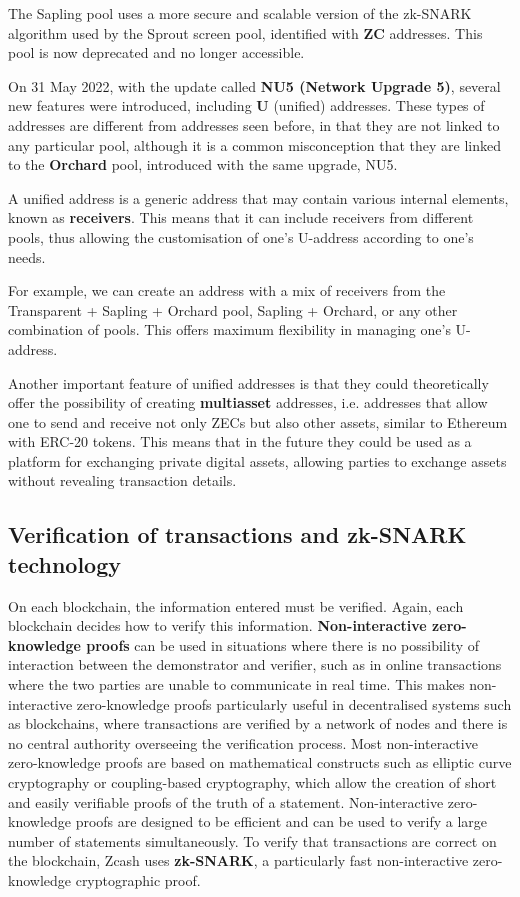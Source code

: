 \noindent The Sapling pool uses a more secure and scalable version of the zk-SNARK algorithm used by the Sprout screen pool, identified with \textbf{ZC} addresses. This pool is now deprecated and no longer accessible.

\noindent On 31 May 2022, with the update called \textbf{NU5 (Network Upgrade 5)}, several new features were introduced, including \textbf{U} (unified) addresses. These types of addresses are different from addresses seen before, in that they are not linked to any particular pool, although it is a common misconception that they are linked to the \textbf{Orchard} pool, introduced with the same upgrade, NU5.

\noindent A unified address is a generic address that may contain various internal elements, known as \textbf{receivers}. This means that it can include receivers from different pools, thus allowing the customisation of one's U-address according to one's needs.

\noindent For example, we can create an address with a mix of receivers from the Transparent + Sapling + Orchard pool, Sapling + Orchard, or any other combination of pools. This offers maximum flexibility in managing one's U-address.

\noindent Another important feature of unified addresses is that they could theoretically offer the possibility of creating \textbf{multiasset} addresses, i.e. addresses that allow one to send and receive not only ZECs but also other assets, similar to Ethereum with ERC-20 tokens. This means that in the future they could be used as a platform for exchanging private digital assets, allowing parties to exchange assets without revealing transaction details.

\subsection{Verification of transactions and zk-SNARK technology}

On each blockchain, the information entered must be verified. Again, each blockchain decides how to verify this information. \textbf{Non-interactive zero-knowledge proofs} can be used in situations where there is no possibility of interaction between the demonstrator and verifier, such as in online transactions where the two parties are unable to communicate in real time. This makes non-interactive zero-knowledge proofs particularly useful in decentralised systems such as blockchains, where transactions are verified by a network of nodes and there is no central authority overseeing the verification process. Most non-interactive zero-knowledge proofs are based on mathematical constructs such as elliptic curve cryptography or coupling-based cryptography, which allow the creation of short and easily verifiable proofs of the truth of a statement. Non-interactive zero-knowledge proofs are designed to be efficient and can be used to verify a large number of statements simultaneously. To verify that transactions are correct on the blockchain, Zcash uses \textbf{zk-SNARK}, a particularly fast non-interactive zero-knowledge cryptographic proof.

